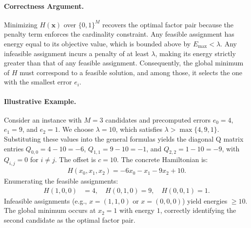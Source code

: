 \documentclass[12pt]{article}
\begin{document}
\paragraph{Correctness Argument.}
Minimizing $H(\mathbf{x})$ over $\{0,1\}^M$ recovers the optimal factor pair because the penalty term enforces the cardinality constraint. Any feasible assignment has energy equal to its objective value, which is bounded above by $E_{\max} < \lambda$. Any infeasible assignment incurs a penalty of at least $\lambda$, making its energy strictly greater than that of any feasible assignment. Consequently, the global minimum of $H$ must correspond to a feasible solution, and among those, it selects the one with the smallest error $e_i$.

\paragraph{Illustrative Example.}
Consider an instance with $M=3$ candidates and precomputed errors $e_0 = 4$, $e_1 = 9$, and $e_2 = 1$. We choose $\lambda = 10$, which satisfies $\lambda > \max\{4, 9, 1\}$. Substituting these values into the general formulas yields the diagonal Q matrix entries $Q_{0,0} = 4 - 10 = -6$, $Q_{1,1} = 9 - 10 = -1$, and $Q_{2,2} = 1 - 10 = -9$, with $Q_{i,j} = 0$ for $i \neq j$. The offset is $c = 10$. The concrete Hamiltonian is:
\begin{align}
H(x_0, x_1, x_2) = -6x_0 - x_1 - 9x_2 + 10.
\end{align}
Enumerating the feasible assignments:
\begin{align}
H(1,0,0) &= 4, \quad H(0,1,0) = 9, \quad H(0,0,1) = 1.
\end{align}
Infeasible assignments (e.g., $x=(1,1,0)$ or $x=(0,0,0)$) yield energies $\ge 10$. The global minimum occurs at $x_2 = 1$ with energy $1$, correctly identifying the second candidate as the optimal factor pair.
\end{document}
